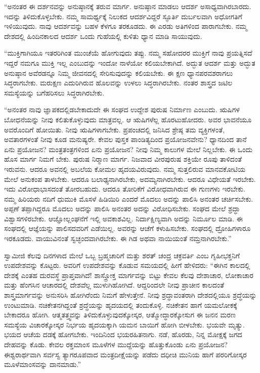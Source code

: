 \vskip 1pt

 “ಅನಂತರ ಈ ದರ್ಶನವನ್ನು ಅನುಷ್ಠಾನಕ್ಕೆ ತರುವ ಮಾರ್ಗ. ಅನುಷ್ಠಾನ ಮಾಡಲು ಆದರ್ಶ ಅಸಾಧ್ಯವಾಗಿರಬಾರದು. ಇದನ್ನು ತಿಳಿದುಕೊಳ್ಳಬೇಕು. ನಮ್ಮ ಸಾಮರ್ಥ್ಯಕ್ಕೆ ನಿಲುಕದ ಆದರ್ಶವಿದ್ದರೆ ಸ್ಫೂರ್ತಿ ದುರ್ಬಲವಾಗಿ ಅಧೋಗತಿಗೆ ಇಳಿಯುವುದು. ನಾವು ಆದರ್ಶವನ್ನು ಬಹಳ ಕೆಳಗೂ ತರಕೂಡದು. ಈ ಎರಡು ಅತಿಗಳಿಂದ ಪಾರಾಗಬೇಕು. ನಮ್ಮ ದೇಶದಲ್ಲಿ ಹಿಂದಿನಕಾಲದ ಆದರ್ಶ ಒಂದು ಗುಹೆಯಲ್ಲಿ ಕುಳಿತು ಧ್ಯಾನ ಮಾಡಿ ಸಾಯುವುದು.

 “ಮುಕ್ತಿಗಾಗಿಯೂ ಇತರರಿಗಿಂತ ಮುಂಚೆಯೆ ಹೋಗುವುದು ತಪ್ಪು. ನಮ್ಮ ಸಹೋದರರ ಮುಕ್ತಿಗೆ ನಾವು ಪ್ರಯತ್ನಿಸದೆ ಇದ್ದರೆ ನಮಗೂ ಮುಕ್ತಿ ಇಲ್ಲ ಎಂಬುದನ್ನು ಇಂದೋ ನಾಳೆಯೋ‌ ಕಲಿಯಬೇಕಾಗಿದೆ. ಅದ್ಭುತ ಆದರ್ಶ ಮತ್ತು ಅದ್ಭುತ ಅನುಷ್ಠಾನ ಅವೆರಡನ್ನೂ ನಿಮ್ಮ ಜೀವನದಲ್ಲಿ ಸೇರಿಸುವುದನ್ನು ಕಲಿಯಬೇಕು. ಈ ಕ್ಷಣ ಧ್ಯಾನಪರವಶರಾಗಲು ಸಿದ್ಧರಾಗಬೇಕು. ಮರುಕ್ಷಣ ಎದುರಿಗಿರುವ ಹೊಲವನ್ನು ಉಳಲು ಸಿದ್ಧರಾಗಿರಬೇಕು. ನಂತರ ಶಾಸ್ತ್ರದ ಜಟಿಲ ಸಮಸ್ಯೆಯನ್ನು ಬಗೆಹರಿಸಲು ಸಿದ್ಧರಾಗಿರಬೇಕು.

 “ಅನಂತರ ನಾವು ಜ್ಞಾಪಕದಲ್ಲಿಡಬೇಕಾದುದೇ ಈ ಸಂಘದ ಉದ್ದೇಶ ಪುರುಷ ನಿರ್ಮಾಣ ಎಂಬುದು. ಋಷಿಗಳ ಬೋಧನೆಯನ್ನು ನೀವು ಕಲಿತುಕೊಳ್ಳುವುದು ಮಾತ್ರವಲ್ಲ. ಆ ಋಷಿಗಳೆಲ್ಲ ಹೊರಟುಹೋದರು. ಅವರ ಭಾವನೆಯೂ ಅವರೊಂದಿಗೆ ಹೋಯಿತು. ನೀವು ಋಷಿಗಳಾಗಬೇಕು. ಪ್ರಪಂಚದಲ್ಲಿ ಜನಿಸಿದ ಶ್ರೇಷ್ಠ ತಮ ವ್ಯಕ್ತಿಗಳಂತೆ, ಅವತಾರಗಳಂತೆ ನೀವು ಕೂಡ ಮನುಷ್ಯರೇ. ಕೇವಲ ಪುಸ್ತಕ ಪಾಂಡಿತ್ಯದಿಂದ ಪ್ರಯೋಜನವೇನು? ಧ್ಯಾನದಿಂದ ತಾನೆ ಏನು ಪ್ರಯೋಜನ? ಮಂತ್ರತಂತ್ರಗಳಿಂದ ಏನು ಪ್ರಯೋಜನ? ನೀವು ನಿಮ್ಮ ಕಾಲುಗಳ ಮೇಲೆ ನಿಲ್ಲಬೇಕು. ಈ ಒಂದು ಹೊಸ ಮಾರ್ಗ ನಿಮಗೆ ಬೇಕು. ಪುರುಷ ನಿರ‍್ಮಾಣ ಮಾರ್ಗ. ನಿಜವಾದ ವೀರಪುರುಷ ಶಕ್ತಿಯೇ ರೂಪು ತಾಳಿದಂತೆ ಇರುವನು. ಆದರೂ ಅವನಲ್ಲಿ ಅಬಲೆಯ ಕೋಮಲ ಹೃದಯವಿರುವುದು. ನಮ್ಮ ಸುತ್ತಲಿರುವ ಮಾನವಕೋಟಿಯ ಮೇಲೆ ಅನುಕಂಪ ತಾಳಬೇಕು. ಆದರೂ ಬಲಾಢ್ಯನಾಗಿರಬೇಕು, ಅದಮ್ಯನಾಗಿರಬೇಕು. ಆದರೂ ವಿಧೇಯತೆ ಇರಬೇಕು. ಇದು ವಿರೋಧಾಭಾಸದಂತೆ ತೋರಬಹುದು. ಆದರೂ ತೋರಿಕೆಗೆ ವಿರೋಧವಾಗಿರುವ ಈ ಗುಣಗಳು ಇರಬೇಕು. ನಮ್ಮ ಹಿರಿಯರು ನದಿಗೆ ಧುಮುಕಿ ಮೊಸಳೆ ಹಿಡಿಯಿರಿ ಎಂದರೆ ಮೊದಲು ಅದನ್ನು ಪಾಲಿಸಿ ಅನಂತರ ಚರ್ಚಿಸಬೇಕು. ಅಪ್ಪಣೆ ತಪ್ಪಾಗಿದ್ದರೂ ಮೊದಲು ಅದನ್ನು ಪಾಲಿಸಿ ಅನಂತರ ಅದನ್ನು ವಿರೋಧಿಸಬೇಕು. ಸಂಘದ ಮೇಲೆ ಶ್ರದ್ಧಾ ವಿಶ್ವಾಸಗಳಿರಬೇಕು. ಆಜ್ಞೋಲ್ಲಂಘನೆಗೆ ಇಲ್ಲಿ ಅವಕಾಶವಿಲ್ಲ. ನಿರ್ದಾಕ್ಷಿಣ್ಯವಾಗಿ ಅದನ್ನು ನಿರ್ಮೂಲ ಮಾಡಿ. ಈ ಸಂಘದಲ್ಲಿ ಆಜ್ಞೆಯನ್ನು ಪಾಲಿಸದವರಿಗೆ ಎಡೆಯಿಲ್ಲ. ಅವರನ್ನು ಆಚೆಗೆ ಕಳುಹಿಸಬೇಕು. ಸಂಘದಲ್ಲಿ ದ್ರೋಹಿಗಳಾರೂ ಇರಕೂಡದು. ವಾಯುವಿನಂತೆ ಸ್ವಚ್ಛಂದವಾಗಿರಬೇಕು. ಈ ಗಿಡ ಅಥವಾ ನಾಯಿಯಂತೆ ನಮ್ರನಾಗಿರಬೇಕು.” 

 ಸ್ವಾಮೀಜಿ ಕೆಲವು ದಿನಗಳಾದ ಮೇಲೆ ಒಬ್ಬ ಬ್ರಹ್ಮಚಾರಿಗೆ ಮತ್ತು ಶರತ್ ಚಂದ್ರ ಚಕ್ರವರ್ತಿ ಎಂಬ ಗೃಹೀಭಕ್ತನಿಗೆ ಉಪದೇಶವನ್ನು ಕೊಟ್ಟರು. ಅವರಿಗೆ ಉಪದೇಶವನ್ನು ಕೊಡುವ ಸಮಯದಲ್ಲಿ ಹೀಗೆ ಹೇಳಿದರು: “ಈಗಿನ ಕಾಲದಲ್ಲಿ ದೇಶಕ್ಕೆ ಎಂತಹ ದುರವಸ್ಥೆ ಪ್ರಾಪ್ತವಾಗಿದೆ! ಶಾಸ್ತ್ರೋಕ್ತ ಮಾರ್ಗವನ್ನು ಬಿಟ್ಟು ಕೇವಲ ಕೆಲವು ದೇಶಾಚಾರ, ಲೋಕಾಚಾರ ಮತ್ತು ಹೆಂಗಸಿನ ಆಚಾರದಲ್ಲಿ ದೇಶವೆಲ್ಲ ಮುಳುಗಿಹೋಗಿದೆ. ಆದ್ದರಿಂದಲೇ ನೀವು ಪ್ರಾಚೀನ ಕಾಲದಂತೆ ಶಾಸ್ತ್ರಮಾರ್ಗವನ್ನು ಅನುಸರಿಸಿ ಹೋಗಿರೆಂದು ನಿಮಗೆ ಹೇಳುತ್ತೇನೆ. ನೀವು ಶ್ರದ್ಧಾವಂತರಾಗಿ ದೇಶದಲ್ಲಿಯೂ ಶ್ರದ್ಧೆಯನ್ನು ಉಂಟುಮಾಡಿ. ನಚಿಕೇತನಗಿದ್ದಂತೆ ಶ್ರದ್ಧೆಯನ್ನು ಹೃದಯದಲ್ಲಿ ತಂದುಕೊಳ್ಳಿ. ನಚಿಕೇತನ ಹಾಗೆ ಯಮಲೋಕಕ್ಕೆ ಬೇಕಾದರೂ ಹೋಗಿ. ಆತ್ಮತತ್ತ್ವವನ್ನು ತಿಳಿದುಕೊಳ್ಳುವುದಕ್ಕೋಸ್ಕರ, ಆತ್ಮೋದ್ಧಾರಕ್ಕೋಸುಗ ಈ ಜನನ ಮರಣ ಸಮಸ್ಯೆಯ ವಿಚಾರಕ್ಕೋಸ್ಕರ ನಿರ್ಭಯ ಹೃದಯಕ್ಕಾಗಿ ಯಮನ ಬಾಯಿಗೆ ಹೋಗಿ ಬೀಳಬೇಕು. ಭಯವೇ ಮೃತ್ಯು. ಭಯದ ಆಚೆಯ ದಡಕ್ಕೆ ಹೋಗಬೇಕು. ಇಂದಿನಿಂದ ಭಯರಹಿತನಾಗು. ನಡೆ, ಹೊರಡು, ನಿನ್ನ ಮೋಕ್ಷಕ್ಕೆ ಜಗದ ದೇಹವನ್ನು ಕೊಡು. ಕೇವಲ ರಕ್ತಮಾಂಸ ಮೂಳೆಗಳ ಮುದ್ದೆಯನ್ನು ಹೊತ್ತುಕೊಂಡು ಏನು ಪ್ರಯೋಜನ? ಈಶ್ವರಾರ್ಥವಾಗಿ ಸರ್ವಸ್ವ ತ್ಯಾಗರೂಪವಾದ ಮಂತ್ರದೀಕ್ಷೆಯನ್ನು ಪಡೆದು ದಧೀಚಿ ಮುನಿಯ ಹಾಗೆ ಪರರಿಗೋಸ್ಕರ ಮೂಳೆಮಾಂಸವನ್ನು ದಾನಮಾಡು.” 

